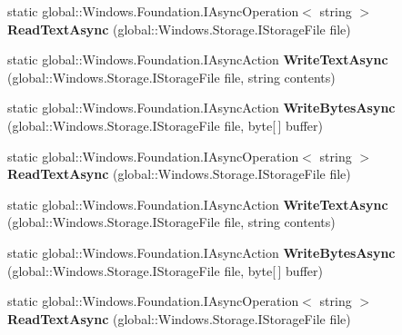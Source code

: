\begin{DoxyCompactItemize}
\item 
\mbox{\label{class_windows_1_1_storage_1_1_file_i_o_a411237b5a14427f6e2c78e10509be853}} 
static global\+::\+Windows.\+Foundation.\+I\+Async\+Operation$<$ string $>$ {\bfseries Read\+Text\+Async} (global\+::\+Windows.\+Storage.\+I\+Storage\+File file)
\item 
\mbox{\label{class_windows_1_1_storage_1_1_file_i_o_aaa50a5498a60e66bd4e0777c65f59200}} 
static global\+::\+Windows.\+Foundation.\+I\+Async\+Action {\bfseries Write\+Text\+Async} (global\+::\+Windows.\+Storage.\+I\+Storage\+File file, string contents)
\item 
\mbox{\label{class_windows_1_1_storage_1_1_file_i_o_a68b7b3281a0169ff7895ebb2d7ee14b2}} 
static global\+::\+Windows.\+Foundation.\+I\+Async\+Action {\bfseries Write\+Bytes\+Async} (global\+::\+Windows.\+Storage.\+I\+Storage\+File file, byte\mbox{[}$\,$\mbox{]} buffer)
\item 
\mbox{\label{class_windows_1_1_storage_1_1_file_i_o_a411237b5a14427f6e2c78e10509be853}} 
static global\+::\+Windows.\+Foundation.\+I\+Async\+Operation$<$ string $>$ {\bfseries Read\+Text\+Async} (global\+::\+Windows.\+Storage.\+I\+Storage\+File file)
\item 
\mbox{\label{class_windows_1_1_storage_1_1_file_i_o_aaa50a5498a60e66bd4e0777c65f59200}} 
static global\+::\+Windows.\+Foundation.\+I\+Async\+Action {\bfseries Write\+Text\+Async} (global\+::\+Windows.\+Storage.\+I\+Storage\+File file, string contents)
\item 
\mbox{\label{class_windows_1_1_storage_1_1_file_i_o_a68b7b3281a0169ff7895ebb2d7ee14b2}} 
static global\+::\+Windows.\+Foundation.\+I\+Async\+Action {\bfseries Write\+Bytes\+Async} (global\+::\+Windows.\+Storage.\+I\+Storage\+File file, byte\mbox{[}$\,$\mbox{]} buffer)
\item 
\mbox{\label{class_windows_1_1_storage_1_1_file_i_o_a411237b5a14427f6e2c78e10509be853}} 
static global\+::\+Windows.\+Foundation.\+I\+Async\+Operation$<$ string $>$ {\bfseries Read\+Text\+Async} (global\+::\+Windows.\+Storage.\+I\+Storage\+File file)

\end{DoxyCompactItemize}
